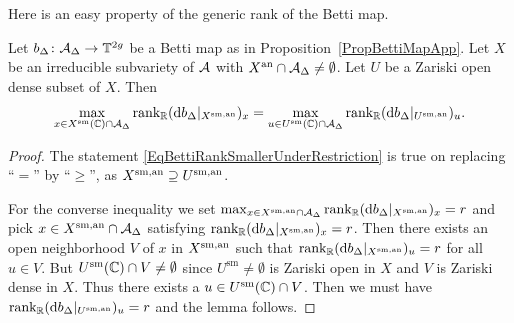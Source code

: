 Here is an easy property of the generic rank of the Betti map.
\begin{lemma}\label{LemmaBettiRankZarOpenApp}
Let $b_{\Delta} \colon \mathcal{A}_{\Delta} \rightarrow \mathbb T^{2g}$ be a Betti map as in Proposition~\ref{PropBettiMapApp}. 
Let $X$ be an irreducible subvariety of $\mathcal{A}$ with ${X}^{\mathrm{an}}\cap\mathcal{A}_\Delta\not=\emptyset$. Let $U$ be a Zariski open dense subset of $X$. Then
\begin{equation}\label{EqBettiRankSmallerUnderRestriction}
\max_{x \in X^{\mathrm{sm}}({\mathbb{C}}) \cap \mathcal{A}_{\Delta}} \mathrm{rank}_{{\mathbb{R}}} (\mathrm{d}b_{\Delta}|_{X^{\mathrm{sm,an}}})_x = \max_{u \in U^{\mathrm{sm}}({\mathbb{C}}) \cap \mathcal{A}_{\Delta}} \mathrm{rank}_{{\mathbb{R}}} (\mathrm{d}b_{\Delta}|_{U^{\mathrm{sm,an}}})_u.
\end{equation}
\end{lemma}
\begin{proof}
The statement \eqref{EqBettiRankSmallerUnderRestriction} is true on
replacing ``$=$'' by  ``$\ge$'', as
 ${X}^{\mathrm{sm,an}}\supseteq {U}^{\mathrm{sm,an}}$. 

For the converse inequality we set
 $\max_{x \in {X}^{\mathrm{sm,an}} \cap \mathcal{A}_{\Delta}} \mathrm{rank}_{{\mathbb{R}}} (\mathrm{d}b_{\Delta}|_{X^{\mathrm{sm,an}}})_x  = r$
and pick
 $x \in {X}^{\mathrm{sm,an}} \cap \mathcal{A}_{\Delta}$ satisfying
$\mathrm{rank}_{{\mathbb{R}}} (\mathrm{d}b_{\Delta}|_{X^{\mathrm{sm,an}}})_x =
r$. Then there exists an open neighborhood  $V$ of $x$ in 
${X}^{\mathrm{sm,an}}$ such that $\mathrm{rank}_{{\mathbb{R}}}
(\mathrm{d}b_{\Delta}|_{X^{\mathrm{sm,an}}})_u = r$ for all $u \in
V$. But $U^{\mathrm{sm}}({\mathbb{C}}) \cap V \not= \emptyset$ since
$U^{\mathrm{sm}}\not=\emptyset$ is Zariski open in $X$ and $V$ is Zariski dense
in $X$. Thus there exists a $u \in U^{\mathrm{sm}}({\mathbb{C}}) \cap V$. Then
we must have $\mathrm{rank}_{{\mathbb{R}}}
(\mathrm{d}b_{\Delta}|_{U^{\mathrm{sm,an}}})_u = r$ and the lemma
follows.
\end{proof}


